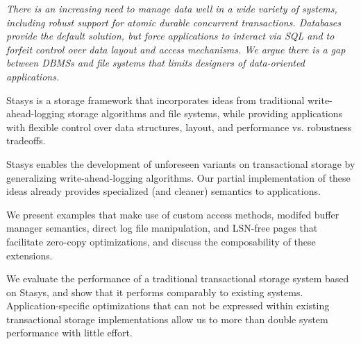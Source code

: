 \documentclass[letterpaper,twocolumn,10pt]{article}
\newcommand{\yad}{Stasys\xspace}
\begin{document}
{\em There is an increasing need to manage data well in a wide variety of
systems, including robust support for atomic durable concurrent
transactions.  Databases provide the default solution, but force
applications to interact via SQL and to forfeit control over data
layout and access mechanisms.  We argue there is a gap between DBMSs and file systems that limits designers of data-oriented applications.

\yad is a storage framework that incorporates ideas from traditional
write-ahead-logging storage algorithms and file systems,
while providing applications with flexible control over data structures, layout, and performance vs. robustness tradeoffs.

\yad enables the development of
unforeseen variants on transactional storage by generalizing
write-ahead-logging algorithms.  Our partial implementation of these
ideas already provides specialized (and cleaner) semantics to applications.


We present examples that make use of custom access methods,
modifed buffer manager semantics, direct log file manipulation, and
LSN-free pages that facilitate zero-copy optimizations, and discuss
the composability of these extensions.

We evaluate the performance of a traditional transactional storage
system based on \yad, and show that it performs comparably to existing
systems.  Application-specific optimizations that can not be expressed
within existing transactional storage implementations allow us to more
than double system performance with little effort.  }

\end{document}
